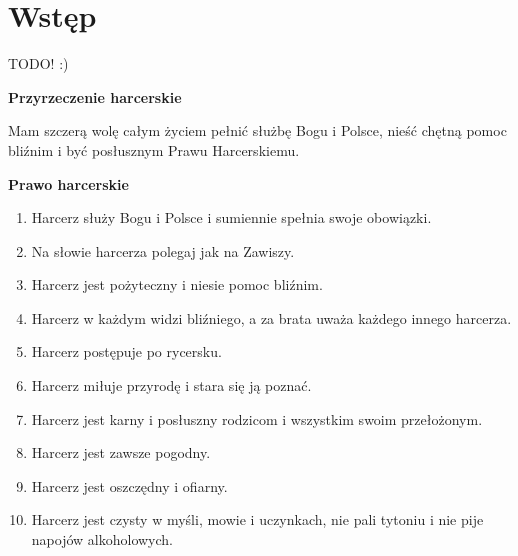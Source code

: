 \chapter{Wstęp}

TODO! :)



\textbf{Przyrzeczenie harcerskie}%

Mam szczerą wolę całym życiem pełnić służbę Bogu i Polsce, nieść chętną pomoc bliźnim i być posłusznym Prawu Harcerskiemu.


\textbf{Prawo harcerskie}%
\begin{enumerate} 
\item Harcerz służy Bogu i Polsce i sumiennie spełnia swoje obowiązki.
\item Na słowie harcerza polegaj jak na Zawiszy.
\item Harcerz jest pożyteczny i niesie pomoc bliźnim.
\item Harcerz w każdym widzi bliźniego, a za brata uważa każdego innego harcerza.
\item Harcerz postępuje po rycersku.
\item Harcerz miłuje przyrodę i stara się ją poznać.
\item Harcerz jest karny i posłuszny rodzicom i wszystkim swoim przełożonym.
\item Harcerz jest zawsze pogodny.
\item Harcerz jest oszczędny i ofiarny.
\item Harcerz jest czysty w myśli, mowie i uczynkach, nie pali tytoniu i nie pije napojów alkoholowych.
\end{enumerate}

